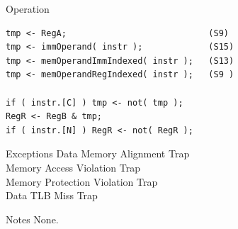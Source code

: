 \begin{iPageDescOpEntry}{Operation}
\begin{lstlisting}[style=iPageOpStyle]
tmp <- RegA;                            (S9)
tmp <- immOperand( instr );             (S15)
tmp <- memOperandImmIndexed( instr );   (S13)
tmp <- memOperandRegIndexed( instr );   (S9 )

if ( instr.[C] ) tmp <- not( tmp );
RegR <- RegB & tmp;
if ( instr.[N] ) RegR <- not( RegR );
\end{lstlisting}
\end{iPageDescOpEntry}

\begin{iPageDescEntry}{Exceptions}
  Data Memory Alignment Trap\\
  Memory Access Violation Trap\\
  Memory Protection Violation Trap\\
  Data TLB Miss Trap
\end{iPageDescEntry}

\begin{iPageDescEntry}{Notes}
  None. 
\end{iPageDescEntry}





